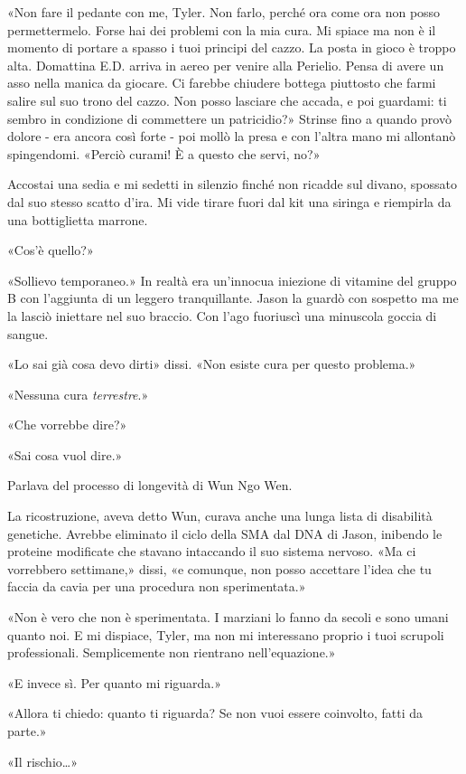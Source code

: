 «Non fare il pedante con me, Tyler. Non farlo, perché ora come ora non
posso permettermelo. Forse hai dei problemi con la mia cura. Mi spiace
ma non è il momento di portare a spasso i tuoi principi del cazzo. La
posta in gioco è troppo alta. Domattina E.D. arriva in aereo per venire
alla Perielio. Pensa di avere un asso nella manica da giocare. Ci
farebbe chiudere bottega piuttosto che farmi salire sul suo trono del
cazzo. Non posso lasciare che accada, e poi guardami: ti sembro in
condizione di commettere un patricidio?» Strinse fino a quando provò
dolore - era ancora così forte - poi mollò la presa e con l'altra mano
mi allontanò spingendomi. «Perciò curami! È a questo che servi, no?»

Accostai una sedia e mi sedetti in silenzio finché non ricadde sul
divano, spossato dal suo stesso scatto d'ira. Mi vide tirare fuori dal
kit una siringa e riempirla da una bottiglietta marrone.

«Cos'è quello?»

«Sollievo temporaneo.» In realtà era un'innocua iniezione di vitamine
del gruppo B con l'aggiunta di un leggero tranquillante. Jason la guardò
con sospetto ma me la lasciò iniettare nel suo braccio. Con l'ago
fuoriuscì una minuscola goccia di sangue.

«Lo sai già cosa devo dirti» dissi. «Non esiste cura per questo
problema.»

«Nessuna cura \emph{terrestre}.»

«Che vorrebbe dire?»

«Sai cosa vuol dire.»

Parlava del processo di longevità di Wun Ngo Wen.

La ricostruzione, aveva detto Wun, curava anche una lunga lista di
disabilità genetiche. Avrebbe eliminato il ciclo della SMA dal DNA di
Jason, inibendo le proteine modificate che stavano intaccando il suo
sistema nervoso. «Ma ci vorrebbero settimane,» dissi, «e comunque, non
posso accettare l'idea che tu faccia da cavia per una procedura non
sperimentata.»

«Non è vero che non è sperimentata. I marziani lo fanno da secoli e sono
umani quanto noi. E mi dispiace, Tyler, ma non mi interessano proprio i
tuoi scrupoli professionali. Semplicemente non rientrano
nell'equazione.»

«E invece sì. Per quanto mi riguarda.»

«Allora ti chiedo: quanto ti riguarda? Se non vuoi essere coinvolto,
fatti da parte.»

«Il rischio\ldots»


